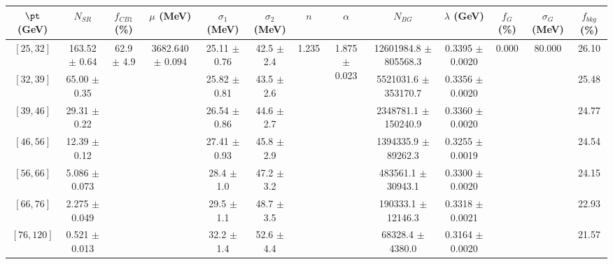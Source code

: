 \begin{tabular}{c||c|c|c|c|c|c|c|c|c|c|c||c}
$\pt$ (GeV) & $N_{SR}$ & $f_{CB1}$ (\%) & $\mu$ (MeV) & $\sigma_1$ (MeV) & $\sigma_2$ (MeV) & $n$ & $\alpha$ & $N_{BG}$ & $\lambda$ (GeV) & $f_G$ (\%) & $\sigma_G$ (MeV) & $f_{bkg}$ (\%) \\
\hline
$[25, 32]$ & 163.52 $\pm$ 0.64 & \multirow{7}{*}{62.9 $\pm$ 4.9} & \multirow{7}{*}{3682.640 $\pm$ 0.094} & 25.11 $\pm$ 0.76 & 42.5 $\pm$ 2.4 & \multirow{7}{*}{1.235} & \multirow{7}{*}{1.875 $\pm$ 0.023} & 12601984.8 $\pm$ 805568.3 & 0.3395 $\pm$ 0.0020 & \multirow{7}{*}{0.000} & \multirow{7}{*}{80.000} & 26.10\\
$[32, 39]$ & 65.00 $\pm$ 0.35 &  &  & 25.82 $\pm$ 0.81 & 43.5 $\pm$ 2.6 &  &  & 5521031.6 $\pm$ 353170.7 & 0.3356 $\pm$ 0.0020 &  &  & 25.48\\
$[39, 46]$ & 29.31 $\pm$ 0.22 &  &  & 26.54 $\pm$ 0.86 & 44.6 $\pm$ 2.7 &  &  & 2348781.1 $\pm$ 150240.9 & 0.3360 $\pm$ 0.0020 &  &  & 24.77\\
$[46, 56]$ & 12.39 $\pm$ 0.12 &  &  & 27.41 $\pm$ 0.93 & 45.8 $\pm$ 2.9 &  &  & 1394335.9 $\pm$ 89262.3 & 0.3255 $\pm$ 0.0019 &  &  & 24.54\\
$[56, 66]$ & 5.086 $\pm$ 0.073 &  &  & 28.4 $\pm$ 1.0 & 47.2 $\pm$ 3.2 &  &  & 483561.1 $\pm$ 30943.1 & 0.3300 $\pm$ 0.0020 &  &  & 24.15\\
$[66, 76]$ & 2.275 $\pm$ 0.049 &  &  & 29.5 $\pm$ 1.1 & 48.7 $\pm$ 3.5 &  &  & 190333.1 $\pm$ 12146.3 & 0.3318 $\pm$ 0.0021 &  &  & 22.93\\
$[76, 120]$ & 0.521 $\pm$ 0.013 &  &  & 32.2 $\pm$ 1.4 & 52.6 $\pm$ 4.4 &  &  & 68328.4 $\pm$ 4380.0 & 0.3164 $\pm$ 0.0020 &  &  & 21.57\\
\end{tabular}
